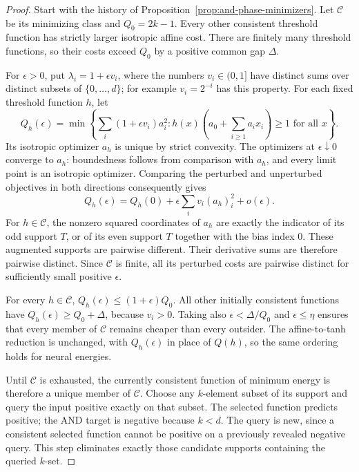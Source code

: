 \begin{proof}
Start with the history of Proposition~\ref{prop:and-phase-minimizers}.
Let $\mathcal C$ be its minimizing class and $Q_0=2k-1$. Every other
consistent threshold function has strictly larger isotropic affine cost.
There are finitely many threshold functions, so their costs exceed $Q_0$
by a positive common gap $\Delta$.

For $\epsilon>0$, put $\lambda_i=1+\epsilon v_i$, where the numbers
$v_i\in(0,1]$ have distinct sums over distinct subsets of
$\{0,\ldots,d\}$; for example $v_i=2^{-i}$ has this property.
For each fixed threshold function $h$, let
\[
 Q_h(\epsilon)=\min\left\{\sum_i(1+\epsilon v_i)a_i^2:
             h(x)(a_0+\textstyle\sum_{i\ge1}a_ix_i)\ge1
             \text{ for all }x\right\}.
\]
Its isotropic optimizer $a_h$ is unique by strict convexity. The
optimizers at $\epsilon\downarrow0$ converge to $a_h$: boundedness
follows from comparison with $a_h$, and every limit point is an isotropic
optimizer. Comparing the perturbed and unperturbed objectives in both
directions consequently gives
\[
 Q_h(\epsilon)=Q_h(0)+\epsilon\sum_i v_i(a_h)_i^2+o(\epsilon).
\]
For $h\in\mathcal C$, the nonzero squared coordinates of $a_h$ are
exactly the indicator of its odd support $T$, or of its even support
$T$ together with the bias index $0$. These augmented supports are
pairwise different. Their derivative sums are therefore pairwise
distinct. Since $\mathcal C$ is finite, all its perturbed costs are
pairwise distinct for sufficiently small positive $\epsilon$.

For every $h\in\mathcal C$,
$Q_h(\epsilon)\le(1+\epsilon)Q_0$. All other initially consistent
functions have $Q_h(\epsilon)\ge Q_0+\Delta$, because $v_i>0$.
Taking also $\epsilon<\Delta/Q_0$ and $\epsilon\le\eta$ ensures that
every member of $\mathcal C$ remains cheaper than every outsider.
The affine-to-tanh reduction is unchanged, with $Q_h(\epsilon)$ in
place of $Q(h)$, so the same ordering holds for neural energies.

Until $\mathcal C$ is exhausted, the currently consistent function of
minimum energy is therefore a unique member of $\mathcal C$. Choose
any $k$-element subset of its support and query the input positive
exactly on that subset. The selected function predicts positive; the
AND target is negative because $k<d$. The query is new, since a
consistent selected function cannot be positive on a previously
revealed negative query. This step eliminates exactly those candidate
supports containing the queried $k$-set.


\end{proof}
